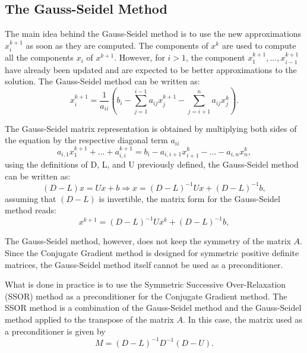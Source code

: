 \subsection{The Gauss-Seidel Method}
The main idea behind the Gauss-Seidel method is to use the new approximations $x^{k+1}_i$ as soon as they are computed. The components of $x^k$ are used to compute all the components $x_i$ of $x^{k+1}$. However, for $i>1$, the component $x_1^{k+1}, ..., x_{i-1}^{k+1}$ have already been updated and are expected to be better approximations to the solution. The Gauss-Seidel method can be written as:
\begin{equation}
    x^{k+1}_i = \frac{1}{a_{ii}} \left( b_i - \sum_{j=1}^{i-1} a_{ij}x^{k+1}_j - \sum_{j=i+1}^{n} a_{ij}x^k_j \right).
\end{equation}

The Gauss-Seidel matrix representation is obtained by multiplying both sides of the equation by the respective diagonal term $a_{ii}$
\begin{equation*}
    a_{i,1} x_1^{k+1} + ... + a_{i,i}^{k+1} = b_i - a_{i,i+1}x_{i+1}^k - ... - a_{i,n}x_n^k,
\end{equation*}
using the definitions of D, L, and U previously defined, the Gauss-Seidel method can be written as:
\begin{equation*}
    (D - L)x = Ux + b \Rightarrow x = (D - L)^{-1}Ux + (D - L)^{-1}b,
\end{equation*}
assuming that $(D - L)$ is invertible, the matrix form for the Gauss-Seidel method reads:
\begin{equation}
    x^{k+1} = (D - L)^{-1}Ux^k + (D - L)^{-1}b,
\end{equation}

The Gauss-Seidel method, however, does not keep the symmetry of the matrix $A$. Since the Conjugate Gradient method is designed for symmetric positive definite matrices, the Gauss-Seidel method itself cannot be used as a preconditioner. 

What is done in practice is to use the Symmetric Successive Over-Relaxation (SSOR) method as a preconditioner for the Conjugate Gradient method. The SSOR method is a combination of the Gauss-Seidel method and the Gauss-Seidel method applied to the transpose of the matrix $A$. In this case, the matrix used as a preconditioner is given by 
\begin{equation}
    \label{eq:SSOR}
    M = (D - L)^{-1}D^{-1}(D - U).
\end{equation}

